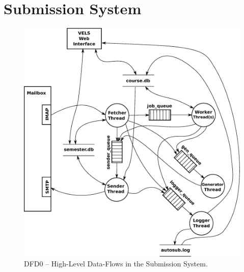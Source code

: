 \newpage
\section{Submission System}\label{sec:autosub}

\begin{figure}[h]
    \begin{center}
    \includegraphics[width=12cm]{images/autosub_future.eps}
    \caption{DFD0 -- High-Level Data-Flows in the Submission System.}
    \label{fig:dfd0}
    \end{center}
\end{figure}


